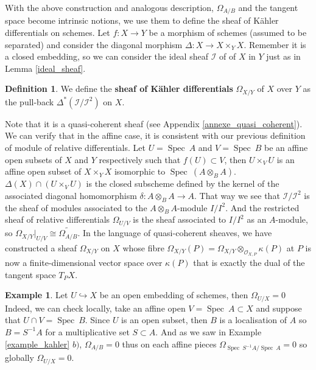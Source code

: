 \documentclass{article}
\theoremstyle{plain}
\theoremstyle{definition}
\newtheorem{definition}[theorem]{Definition}
\newtheorem{example}[theorem]{Example}
\DeclareMathOperator{\Spec}{Spec}
\begin{document}
\noindent With the above construction and analogous description, $\Omega_{A/B}$ and the tangent space become intrinsic notions, we use them to define the sheaf of K\"ahler differentials on schemes.
Let $f: X\rightarrow Y$ be a morphism of schemes (assumed to be separated) and consider the diagonal morphism $\Delta : X\rightarrow X\times_Y X$.
Remember it is a closed embedding, so we can consider the ideal sheaf $\mathcal{I}$ of of $X$ in $Y$ just as in Lemma \ref{ideal_sheaf}.

\begin{definition}
    We define the \textbf{sheaf of K\"ahler differentials} $\Omega_{X/Y}$ of $X$ over $Y$ as the pull-back $\Delta^*(\mathcal{I}/\mathcal{I}^2)$ on $X$. 
\end{definition}

\noindent Note that it is a quasi-coherent sheaf (see Appendix \ref{annexe_quasi_coherent}).
We can verify that in the affine case, it is consistent with our previous definition of module of relative differentials.
Let $U=\Spec\:A$ and $V=\Spec\:B$ be an affine open subsets of $X$ and $Y$ respectively such that $f(U) \subset V$, then $U\times_V U$ is an affine open subset of $X\times_Y X$ isomorphic to $\Spec\:(A\otimes_B A)$.
$\Delta(X)\cap (U\times_V U)$ is the closed subscheme defined by the kernel of the associated diagonal homomorphism $\delta :A\otimes _B A\rightarrow A$.
That way we see that $\mathcal{I}/\mathcal{I}^2$ is the sheaf of modules associated to the $A\otimes_BA$-module $I/I^2$. 
And the restricted sheaf of relative differentials $\Omega_{U/V}$ is the sheaf associated to $I/I^2$ as an $A$-module, so $\Omega_{X/Y}\vert_{U/V} \cong \widetilde{\Omega_{A/B}}$.
In the language of quasi-coherent sheaves, we have constructed a sheaf $\Omega_{X/Y}$ on $X$ whose fibre $\Omega_{X/Y}(P) = \Omega_{X/Y}\otimes_{\mathcal{O}_{X,P}} \kappa(P)$ at $P$ is now a finite-dimensional vector space over $\kappa(P)$ that is exactly the dual of the tangent space $T_PX$.

\begin{example}
\label{open_embeddings_zero_kahler}
    Let $U\hookrightarrow X$ be an open embedding of schemes, then $\Omega_{U/X} = 0$\\
    Indeed, we can check locally, take an affine open $V=\Spec\:A\subset X$ and suppose that $U\cap V = \Spec\: B$. Since $U$ is an open subset, then $B$ is a localisation of $A$ so $B=S^{-1}A$ for a multiplicative set $S\subset A$. And as we saw in Example \ref{example_kahler} $b)$, $\Omega_{A/B}=0$ thus on each affine pieces $\Omega_{\Spec\:S^{-1}A/\Spec\:A} = 0$ so globally $\Omega_{U/X} = 0$.
\end{example}
\end{document}
